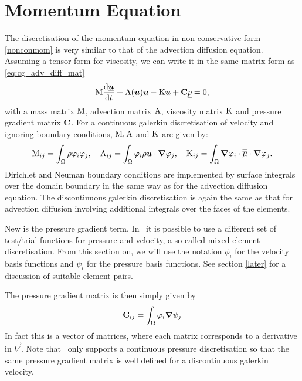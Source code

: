 \section{Momentum Equation}
\label{Sect:ND_momentum_equation}
The discretisation of the momentum equation in non-conservative 
form \eqref{nonconmom} is very similar to that of the advection 
diffusion equation. Assuming a tensor form for viscosity, we 
can write it in the same matrix form as
\eqref{eq:cg_adv_diff_mat}
\begin{equation*}
  \mathrm{M} \frac{\mathrm{d}\underline{{\mbox{\boldmath$u$}}}}{\mathrm{d} t}
    +\mathrm{A}({\mbox{\boldmath$u$}})\underline{{\mbox{\boldmath$u$}}}-\mathrm{K}\underline{{\mbox{\boldmath$u$}}}
    +{\mbox{\boldmath$\mathrm{C}$}} \underline{p}
    =0,
\end{equation*}
with a mass matrix $\mathrm{M}$, advection matrix $\mathrm{A}$,
viscosity matrix $\mathrm{K}$ and pressure gradient matrix ${\mbox{\boldmath$\mathrm{C}$}}$.
For a continuous galerkin discretisation of 
velocity and ignoring boundary conditions, $\mathrm{M}, \mathrm{A}$ and $\mathrm{K}$
are given by:
\begin{equation*}
  \mathrm{M}_{ij}=\int_\Omega \rho\varphi_i\varphi_j, \quad
  \mathrm{A}_{ij}=\int_\Omega \varphi_i\rho{\mbox{\boldmath$u$}}\cdot{\mbox{\boldmath$\nabla$}} \varphi_j, \quad
  \mathrm{K}_{ij}=\int_\Omega {\mbox{\boldmath$\nabla$}}\varphi_i\cdot \overline{\overline{\mu}}\cdot{\mbox{\boldmath$\nabla$}} \varphi_j.
\end{equation*}
Dirichlet and Neuman boundary conditions are implemented by 
surface integrals over the domain boundary in the same way 
as for the advection diffusion equation. The discontinuous galerkin
discretisation is again the same as that for advection diffusion 
involving additional integrals over the faces of the elements.

New is the pressure gradient term. In \fluidity\ it is possible 
to use a different set of test/trial functions for pressure 
and velocity, a so called mixed element discretisation. From this section 
on, we will use the notation $\phi_i$ for the velocity 
basis functions and $\psi_i$ for the pressure basis functions.
See section \ref{later} for a discussion of suitable element-pairs.

The pressure gradient matrix is then simply given by
\begin{equation}
  {\mbox{\boldmath$\mathrm{C}$}}_{ij}=\int_\Omega \varphi_i{\mbox{\boldmath$\nabla$}}\psi_j \label{pgmatrix}
\end{equation}
In fact this is a vector of matrices, where each matrix corresponds
to a derivative in $\vec\nabla$. Note that \fluidity\ only supports
a continuous pressure discretisation so that the same 
pressure gradient matrix is well defined for a discontinuous galerkin 
velocity.

